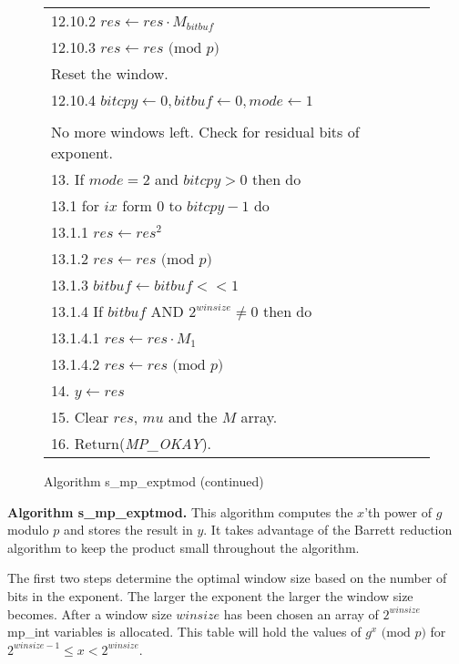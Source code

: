 \documentclass[b5paper]{book}
\begin{document}
\begin{figure}[!here]
\begin{small}
\begin{center}
\begin{tabular}{l}
\hspace{6mm}12.10.2  $res \leftarrow res \cdot M_{bitbuf}$ \\
\hspace{6mm}12.10.3  $res \leftarrow res \mbox{ (mod }p\mbox{)}$ \\
\hspace{6mm}Reset the window. \\
\hspace{6mm}12.10.4  $bitcpy \leftarrow 0, bitbuf \leftarrow 0, mode \leftarrow 1$ \\
\\
No more windows left.  Check for residual bits of exponent. \\
13.  If $mode = 2$ and $bitcpy > 0$ then do \\
\hspace{3mm}13.1  for $ix$ form $0$ to $bitcpy - 1$ do \\
\hspace{6mm}13.1.1  $res \leftarrow res^2$ \\
\hspace{6mm}13.1.2  $res \leftarrow res \mbox{ (mod }p\mbox{)}$ \\
\hspace{6mm}13.1.3  $bitbuf \leftarrow bitbuf << 1$ \\
\hspace{6mm}13.1.4  If $bitbuf$ AND $2^{winsize} \ne 0$ then do \\
\hspace{9mm}13.1.4.1  $res \leftarrow res \cdot M_{1}$ \\
\hspace{9mm}13.1.4.2  $res \leftarrow res \mbox{ (mod }p\mbox{)}$ \\
14.  $y \leftarrow res$ \\
15.  Clear $res$, $mu$ and the $M$ array. \\
16.  Return(\textit{MP\_OKAY}). \\
\hline
\end{tabular}
\end{center}
\end{small}
\caption{Algorithm s\_mp\_exptmod (continued)}
\end{figure}

\textbf{Algorithm s\_mp\_exptmod.}
This algorithm computes the $x$'th power of $g$ modulo $p$ and stores the result in $y$.  It takes advantage of the Barrett reduction
algorithm to keep the product small throughout the algorithm.

The first two steps determine the optimal window size based on the number of bits in the exponent.  The larger the exponent the 
larger the window size becomes.  After a window size $winsize$ has been chosen an array of $2^{winsize}$ mp\_int variables is allocated.  This
table will hold the values of $g^x \mbox{ (mod }p\mbox{)}$ for $2^{winsize - 1} \le x < 2^{winsize}$.  
\end{document}

